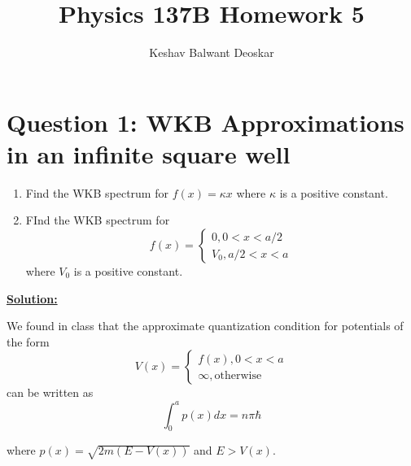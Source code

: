 \documentclass{article}
\title{Physics 137B Homework 5}
\author{Keshav Balwant Deoskar}
\begin{document}
\maketitle


\section*{Question 1: WKB Approximations in an infinite square well} 
\begin{enumerate}[label=(\alph*)]
  \item Find the WKB spectrum for $f(x) = \kappa x$ where $\kappa$ is a positive constant.
  \item FInd the WKB spectrum for
  \[ f(x) = \begin{cases}
    0 , 0 < x < a/2 \\
    V_0, a/2 < x < a
  \end{cases} \]
  where $V_0$ is a positive constant.
\end{enumerate}

\vskip 0.5cm
\underline{\textbf{Solution:}} 

\vskip 0.5cm
We found in class that the approximate quantization condition for potentials of the form 
\[ V(x) = \begin{cases}
  f(x), 0 < x < a \\
  \infty, \text{otherwise}
\end{cases} \]
can be written as 
\[ \int_{0}^{a} p(x)dx = n \pi \hbar  \]

where $p(x) = \sqrt{2m(E - V(x))}$ and $E > V(x)$. 
\end{document}
